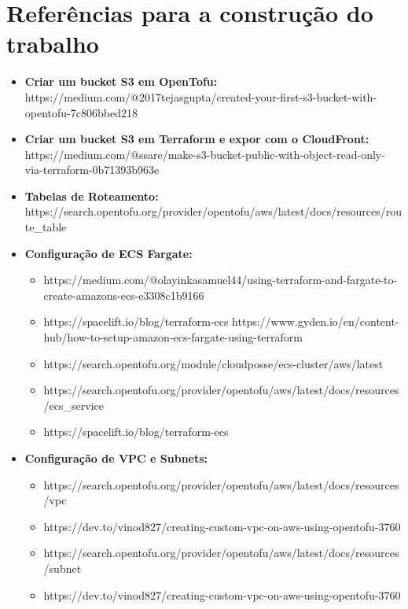 \section{Referências para a construção do trabalho}

\begin{itemize}
	\item \textbf{Criar um bucket S3 em OpenTofu: } https://medium.com/@2017tejasgupta/created-your-first-s3-bucket-with-opentofu-7c806bbed218

	\item \textbf{Criar um bucket S3 em Terraform e expor com o CloudFront:} https://medium.com/@ssare/make-s3-bucket-public-with-object-read-only-via-terraform-0b71393b963e
	
	\item \textbf{Tabelas de Roteamento:} https://search.opentofu.org/provider/opentofu/aws/latest/docs/resources/route\_table

	\item \textbf{Configuração de ECS Fargate: }
	
	\begin{itemize}
		\item https://medium.com/@olayinkasamuel44/using-terraform-and-fargate-to-create-amazons-ecs-e3308c1b9166
		
		\item https://spacelift.io/blog/terraform-ecs
		https://www.gyden.io/en/content-hub/how-to-setup-amazon-ecs-fargate-using-terraform
		
		\item https://search.opentofu.org/module/cloudposse/ecs-cluster/aws/latest
		
		\item https://search.opentofu.org/provider/opentofu/aws/latest/docs/resources/ecs\_service
		
		\item https://spacelift.io/blog/terraform-ecs
	\end{itemize}
	
	\item \textbf{Configuração de VPC e Subnets:}
	
	\begin{itemize}
		\item https://search.opentofu.org/provider/opentofu/aws/latest/docs/resources/vpc
		\item https://dev.to/vinod827/creating-custom-vpc-on-aws-using-opentofu-3760
		\item https://search.opentofu.org/provider/opentofu/aws/latest/docs/resources/subnet
		\item https://dev.to/vinod827/creating-custom-vpc-on-aws-using-opentofu-3760
	\end{itemize}
	
\end{itemize}